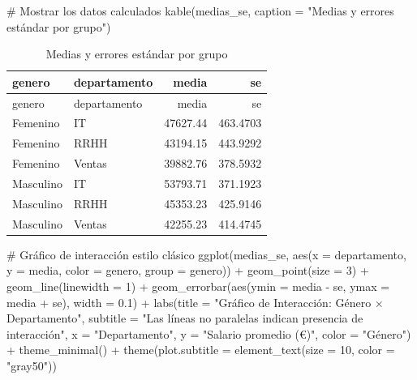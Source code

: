 \documentclass[
  letterpaper,
  DIV=11,
  numbers=noendperiod]{scrreprt}
\newenvironment{Shaded}{\begin{snugshade}}{\end{snugshade}}
\newcommand{\AttributeTok}[1]{\textcolor[rgb]{0.40,0.45,0.13}{#1}}
\newcommand{\CommentTok}[1]{\textcolor[rgb]{0.37,0.37,0.37}{#1}}
\newcommand{\DecValTok}[1]{\textcolor[rgb]{0.68,0.00,0.00}{#1}}
\newcommand{\FloatTok}[1]{\textcolor[rgb]{0.68,0.00,0.00}{#1}}
\newcommand{\FunctionTok}[1]{\textcolor[rgb]{0.28,0.35,0.67}{#1}}
\newcommand{\NormalTok}[1]{\textcolor[rgb]{0.00,0.23,0.31}{#1}}
\newcommand{\SpecialCharTok}[1]{\textcolor[rgb]{0.37,0.37,0.37}{#1}}
\newcommand{\StringTok}[1]{\textcolor[rgb]{0.13,0.47,0.30}{#1}}
\begin{document}
\begin{tcolorbox}
\begin{Shaded}
\begin{Highlighting}[]
\CommentTok{\# Mostrar los datos calculados}
\FunctionTok{kable}\NormalTok{(medias\_se, }\AttributeTok{caption =} \StringTok{"Medias y errores estándar por grupo"}\NormalTok{)}
\end{Highlighting}
\end{Shaded}

\begin{longtable}[]{@{}llrr@{}}
\caption{Medias y errores estándar por grupo}\tabularnewline
\toprule\noalign{}
genero & departamento & media & se \\
\midrule\noalign{}
\endfirsthead
\toprule\noalign{}
genero & departamento & media & se \\
\midrule\noalign{}
\endhead
\bottomrule\noalign{}
\endlastfoot
Femenino & IT & 47627.44 & 463.4703 \\
Femenino & RRHH & 43194.15 & 443.9292 \\
Femenino & Ventas & 39882.76 & 378.5932 \\
Masculino & IT & 53793.71 & 371.1923 \\
Masculino & RRHH & 45353.23 & 425.9146 \\
Masculino & Ventas & 42255.23 & 414.4745 \\
\end{longtable}

\begin{Shaded}
\begin{Highlighting}[]
\CommentTok{\# Gráfico de interacción estilo clásico}
\FunctionTok{ggplot}\NormalTok{(medias\_se, }\FunctionTok{aes}\NormalTok{(}\AttributeTok{x =}\NormalTok{ departamento, }\AttributeTok{y =}\NormalTok{ media, }\AttributeTok{color =}\NormalTok{ genero, }\AttributeTok{group =}\NormalTok{ genero)) }\SpecialCharTok{+}
  \FunctionTok{geom\_point}\NormalTok{(}\AttributeTok{size =} \DecValTok{3}\NormalTok{) }\SpecialCharTok{+}
  \FunctionTok{geom\_line}\NormalTok{(}\AttributeTok{linewidth =} \DecValTok{1}\NormalTok{) }\SpecialCharTok{+}
  \FunctionTok{geom\_errorbar}\NormalTok{(}\FunctionTok{aes}\NormalTok{(}\AttributeTok{ymin =}\NormalTok{ media }\SpecialCharTok{{-}}\NormalTok{ se, }\AttributeTok{ymax =}\NormalTok{ media }\SpecialCharTok{+}\NormalTok{ se), }\AttributeTok{width =} \FloatTok{0.1}\NormalTok{) }\SpecialCharTok{+}
  \FunctionTok{labs}\NormalTok{(}\AttributeTok{title =} \StringTok{"Gráfico de Interacción: Género × Departamento"}\NormalTok{,}
       \AttributeTok{subtitle =} \StringTok{"Las líneas no paralelas indican presencia de interacción"}\NormalTok{,}
       \AttributeTok{x =} \StringTok{"Departamento"}\NormalTok{, }\AttributeTok{y =} \StringTok{"Salario promedio (€)"}\NormalTok{, }\AttributeTok{color =} \StringTok{"Género"}\NormalTok{) }\SpecialCharTok{+}
  \FunctionTok{theme\_minimal}\NormalTok{() }\SpecialCharTok{+}
  \FunctionTok{theme}\NormalTok{(}\AttributeTok{plot.subtitle =} \FunctionTok{element\_text}\NormalTok{(}\AttributeTok{size =} \DecValTok{10}\NormalTok{, }\AttributeTok{color =} \StringTok{"gray50"}\NormalTok{))}
\end{Highlighting}
\end{Shaded}


\end{tcolorbox}
\end{document}
